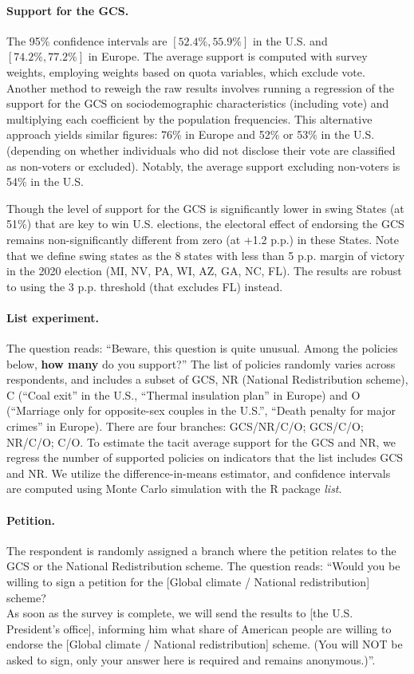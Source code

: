 \begin{small}
\paragraph{\small Support for the GCS.} 
The 95\% confidence intervals are $[52.4\%, 55.9\%]$ in the U.S. and $[74.2\%, 77.2\%]$ in Europe. The average support is computed with survey weights, employing weights based on quota variables, which exclude vote. Another method to reweigh the raw results involves running a regression of the support for the GCS on sociodemographic characteristics (including vote) and multiplying each coefficient by the population frequencies. This alternative approach yields similar figures: 76\% in Europe and 52\% or 53\% in the U.S. (depending on whether individuals who did not disclose their vote are classified as non-voters or excluded). Notably, the average support excluding non-voters is 54\% in the U.S. 

Though the level of support for the GCS is significantly lower in swing States (at 51\%) that are key to win U.S. elections, the electoral effect of endorsing the GCS remains non-significantly different from zero (at +1.2 p.p.) in these States. Note that we define swing states as the 8 states with less than 5 p.p. margin of victory in the 2020 election (MI, NV, PA, WI, AZ, GA, NC, FL). The results are robust to using the 3 p.p. threshold (that excludes FL) instead. 

\paragraph{\small List experiment.}
The question reads: ``Beware, this question is quite unusual. Among the policies below, \textbf{how many} do you support?'' The list of policies randomly varies across respondents, and includes a subset of GCS, NR (National Redistribution scheme), C (``Coal exit'' in the U.S., ``Thermal insulation plan'' in Europe) and O (``Marriage only for opposite-sex couples in the U.S.'', ``Death penalty for major crimes'' in Europe). There are four branches: GCS/NR/C/O; GCS/C/O; NR/C/O; C/O. To estimate the tacit average support for the GCS and NR, we regress the number of supported policies on indicators that the list includes GCS and NR.
We utilize the difference-in-means estimator, and confidence intervals are computed using Monte Carlo simulation with the R package \textit{list}.\citep{imai_multivariate_2011}

\paragraph{\small Petition.}
The respondent is randomly assigned a branch where the petition relates to the GCS or the National Redistribution scheme. The question reads: ``Would you be willing to sign a petition for the [Global climate / National redistribution] scheme? \\ As soon as the survey is complete, we will send the results to [the U.S. President's office], informing him what share of American people are willing to endorse the [Global climate / National redistribution] scheme. (You will NOT be asked to sign, only your answer here is required and remains anonymous.)''. 


\end{small}
